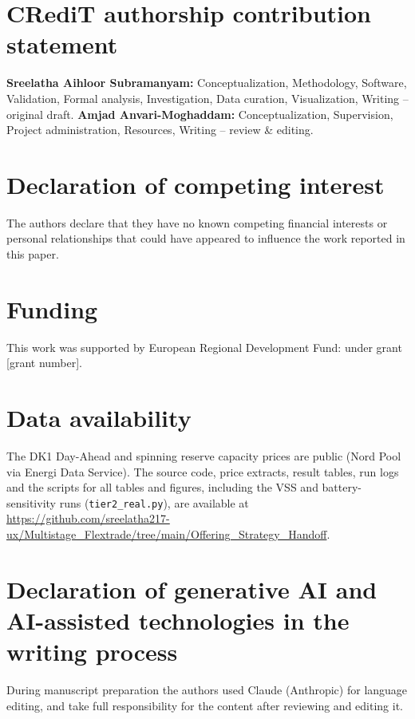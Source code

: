 \documentclass[5p,times,twocolumn]{elsarticle}
\begin{document}
\section*{CRediT authorship contribution statement}
\textbf{Sreelatha Aihloor Subramanyam:} Conceptualization, Methodology, Software, Validation, Formal analysis, Investigation, Data curation, Visualization, Writing -- original draft. \textbf{Amjad Anvari-Moghaddam:} Conceptualization, Supervision, Project administration, Resources, Writing -- review \& editing.

\section*{Declaration of competing interest}
The authors declare that they have no known competing financial interests or personal relationships that could have appeared to influence the work reported in this paper. 

\section*{Funding}
This work was supported by European Regional Development Fund: under grant [grant number].

\section*{Data availability}
The DK1 Day-Ahead and spinning reserve capacity prices are public (Nord Pool via Energi Data Service). The source code, price extracts, result tables, run logs and the scripts for all tables and figures, including the VSS and battery-sensitivity runs (\texttt{tier2\_real.py}), are available at \url{https://github.com/sreelatha217-ux/Multistage_Flextrade/tree/main/Offering_Strategy_Handoff}.

\section*{Declaration of generative AI and AI-assisted technologies in the writing process}
During manuscript preparation the authors used Claude (Anthropic) for language editing, and take full responsibility for the content after reviewing and editing it.



\end{document}
